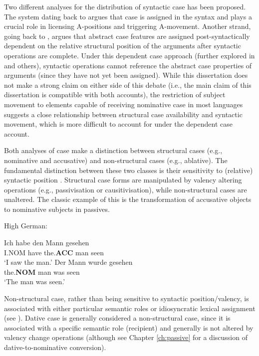 Two different analyses for the distribution of syntactic case has been proposed. The system dating back to \cite{Vergnaud.1977} argues that case is assigned in the syntax and plays a crucial role in licensing A-positions and triggering A-movement. Another strand, going back to \cite{Yip.1987}, argues that abstract case features are assigned post-syntactically dependent on the relative structural position of the arguments after syntactic operations are complete. Under this dependent case approach (further explored in \citealt{Marantz.1991,McFadden.2004} and others), syntactic operations cannot reference the abstract case properties of arguments (since they have not yet been assigned). While this dissertation does not make a strong claim on either side of this debate (i.e., the main claim of this dissertation is compatible with both accounts), the restriction of subject movement to elements capable of receiving nominative case in most languages suggests a close relationship between structural case availability and syntactic movement, which is more difficult to account for under the dependent case account.

Both analyses of case make a distinction between structural cases (e.g., nominative and accusative) and non-structural cases (e.g., ablative). The fundamental distinction between these two classes is their sensitivity to (relative) syntactic position \citep{Woolford.2006}. Structural case forms are manipulated by valency altering operations (e.g., passivisation or causitivisation), while non-structural cases are unaltered. The classic example of this is the transformation of accusative objects to nominative subjects in passives.

\begin{exe}
	\ex High German:\label{ex:hg-accnom}
	\begin{xlist}
		\ex \gll Ich habe den Mann gesehen\\
		I.NOM have the.\textbf{ACC} man seen\\
		\trans `I saw the man.'
		\ex \gll Der Mann wurde gesehen\\
		the.\textbf{NOM} man was seen\\
		\trans `The man was seen.'
	\end{xlist}
\end{exe}

Non-structural case, rather than being sensitive to syntactic position/valency, is associated with either particular semantic roles or idiosyncratic lexical assignment (see \citealt{Woolford.2006}). Dative case is generally considered a non-structural case, since it is associated with a specific semantic role (recipient) and generally is not altered by valency change operations (although see Chapter \ref{ch:passive} for a discussion of dative-to-nominative conversion). 


